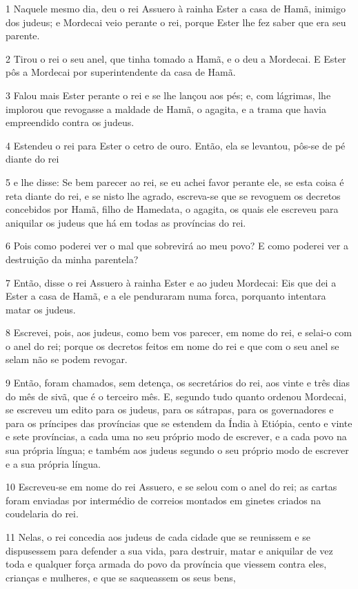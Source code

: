 \par 1 Naquele mesmo dia, deu o rei Assuero à rainha Ester a casa de Hamã, inimigo dos judeus; e Mordecai veio perante o rei, porque Ester lhe fez saber que era seu parente.
\par 2 Tirou o rei o seu anel, que tinha tomado a Hamã, e o deu a Mordecai. E Ester pôs a Mordecai por superintendente da casa de Hamã.
\par 3 Falou mais Ester perante o rei e se lhe lançou aos pés; e, com lágrimas, lhe implorou que revogasse a maldade de Hamã, o agagita, e a trama que havia empreendido contra os judeus.
\par 4 Estendeu o rei para Ester o cetro de ouro. Então, ela se levantou, pôs-se de pé diante do rei
\par 5 e lhe disse: Se bem parecer ao rei, se eu achei favor perante ele, se esta coisa é reta diante do rei, e se nisto lhe agrado, escreva-se que se revoguem os decretos concebidos por Hamã, filho de Hamedata, o agagita, os quais ele escreveu para aniquilar os judeus que há em todas as províncias do rei.
\par 6 Pois como poderei ver o mal que sobrevirá ao meu povo? E como poderei ver a destruição da minha parentela?
\par 7 Então, disse o rei Assuero à rainha Ester e ao judeu Mordecai: Eis que dei a Ester a casa de Hamã, e a ele penduraram numa forca, porquanto intentara matar os judeus.
\par 8 Escrevei, pois, aos judeus, como bem vos parecer, em nome do rei, e selai-o com o anel do rei; porque os decretos feitos em nome do rei e que com o seu anel se selam não se podem revogar.
\par 9 Então, foram chamados, sem detença, os secretários do rei, aos vinte e três dias do mês de sivã, que é o terceiro mês. E, segundo tudo quanto ordenou Mordecai, se escreveu um edito para os judeus, para os sátrapas, para os governadores e para os príncipes das províncias que se estendem da Índia à Etiópia, cento e vinte e sete províncias, a cada uma no seu próprio modo de escrever, e a cada povo na sua própria língua; e também aos judeus segundo o seu próprio modo de escrever e a sua própria língua.
\par 10 Escreveu-se em nome do rei Assuero, e se selou com o anel do rei; as cartas foram enviadas por intermédio de correios montados em ginetes criados na coudelaria do rei.
\par 11 Nelas, o rei concedia aos judeus de cada cidade que se reunissem e se dispusessem para defender a sua vida, para destruir, matar e aniquilar de vez toda e qualquer força armada do povo da província que viessem contra eles, crianças e mulheres, e que se saqueassem os seus bens,
